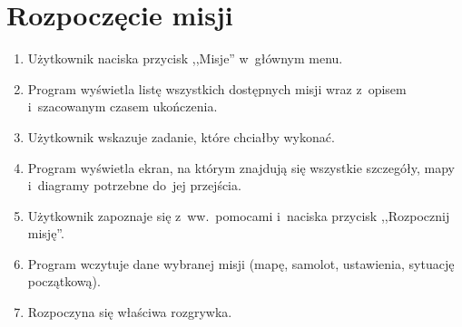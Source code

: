 \documentclass{mwrep}
\begin{document}
\section{Rozpoczęcie misji}
\begin{enumerate}
  \item Użytkownik naciska przycisk ,,Misje'' w~głównym menu.
  \item Program wyświetla listę wszystkich dostępnych misji wraz z~opisem i~szacowanym czasem ukończenia.
  \item Użytkownik wskazuje zadanie, które chciałby wykonać.
  \item Program wyświetla ekran, na którym znajdują się wszystkie szczegóły, mapy i~diagramy potrzebne do~jej przejścia.
  \item Użytkownik zapoznaje się z~ww.~pomocami i~naciska przycisk ,,Rozpocznij misję''.
  \item Program wczytuje dane wybranej misji (mapę, samolot, ustawienia, sytuację początkową).
  \item Rozpoczyna się właściwa rozgrywka.
\end{enumerate}
\end{document}

